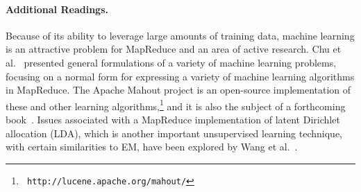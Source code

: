 \paragraph{Additional Readings.}
Because of its ability to leverage large amounts of training data,
machine learning is an attractive problem for MapReduce and an area of
active research.  Chu et al.~\cite{ChuCT_etal_2006} presented general
formulations of a variety of machine learning problems, focusing on a
normal form for expressing a variety of machine learning algorithms in
MapReduce.  The Apache Mahout project is an open-source implementation
of these and other learning algorithms,\footnote{\tt
  http://lucene.apache.org/mahout/} and it is also the subject of a
forthcoming book~\cite{Owen_2010}.  Issues associated with a MapReduce
implementation of latent Dirichlet allocation (LDA), which is another
important unsupervised learning technique, with certain similarities
to EM, have been explored by Wang et al.~\cite{WangYi_etal_2009}.
